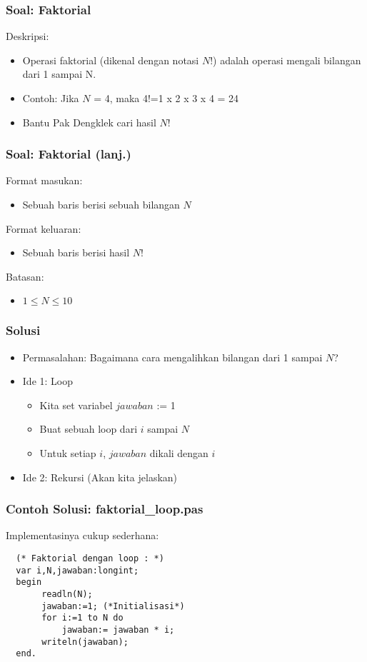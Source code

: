 \documentclass{beamer}
\begin{document}
\begin{frame}
\frametitle{Soal: Faktorial}
Deskripsi:
\begin{itemize}
        \item Operasi faktorial (dikenal dengan notasi $N$!) adalah operasi mengali bilangan dari 1 sampai N.
        \item Contoh: Jika $N$ = 4, maka 4!=1 x 2 x 3 x 4 = 24
        \item Bantu Pak Dengklek cari hasil $N$!
\end{itemize}
\end{frame}
 
\begin{frame}
\frametitle{Soal: Faktorial (lanj.) }
Format masukan:
\begin{itemize}
        \item Sebuah baris berisi sebuah bilangan $N$
\end{itemize}
Format keluaran:
\begin{itemize}
        \item Sebuah baris berisi hasil $N$!
\end{itemize}
Batasan:
\begin{itemize}
        \item $1 \le N \le 10$
\end{itemize}
\end{frame}
 
\begin{frame}
\frametitle{Solusi}
\begin{itemize}
        \item Permasalahan: Bagaimana cara mengalihkan bilangan dari 1 sampai $N$?
    \item Ide 1: Loop
    \begin{itemize}
       \item Kita set variabel $jawaban$ := 1
       \item Buat sebuah loop dari $i$ sampai $N$
       \item Untuk setiap $i$, $jawaban$ dikali dengan $i$
   \end{itemize}
   \item Ide 2: Rekursi (Akan kita jelaskan)   
\end{itemize}
\end{frame}
 
\begin{frame}[fragile]
\frametitle{Contoh Solusi: faktorial\_loop.pas}
Implementasinya cukup sederhana:
\begin{lstlisting}
  (* Faktorial dengan loop : *)
  var i,N,jawaban:longint;
  begin
       readln(N);
       jawaban:=1; (*Initialisasi*)
       for i:=1 to N do
           jawaban:= jawaban * i;
       writeln(jawaban);
  end.
\end{lstlisting}
\end{frame}
 
\end{document}
